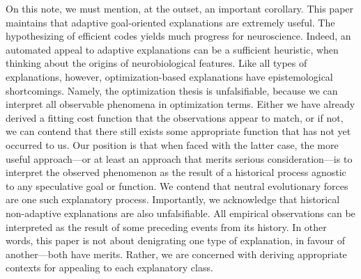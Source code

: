 \documentclass[twocolumn]{article}
\begin{document}
On this note, we must mention, at the outset, an important corollary. This paper maintains that adaptive goal-oriented explanations are extremely useful. The hypothesizing of efficient codes yields much progress for neuroscience. Indeed, an automated appeal to adaptive explanations can be a sufficient heuristic, when thinking about the origins of neurobiological features. Like all types of explanations, however, optimization-based explanations have epistemological shortcomings. Namely, the optimization thesis is unfalsifiable, because we can interpret all observable phenomena in optimization terms. Either we have already derived a fitting cost function that the observations appear to match, or if not, we can contend that there still exists some appropriate function that has not yet occurred to us. Our position is that when faced with the latter case, the more useful approach---or at least an approach that merits serious consideration---is to interpret the observed phenomenon as the result of a historical process agnostic to any speculative goal or function. We contend that neutral evolutionary forces are one such explanatory process. Importantly, we acknowledge that historical non-adaptive explanations are also unfalsifiable. All empirical observations can be interpreted as the result of some preceding events from its history. In other words, this paper is not about denigrating one type of explanation, in favour of another---both have merits. Rather, we are concerned with deriving appropriate contexts for appealing to each explanatory class. 

\end{document}
